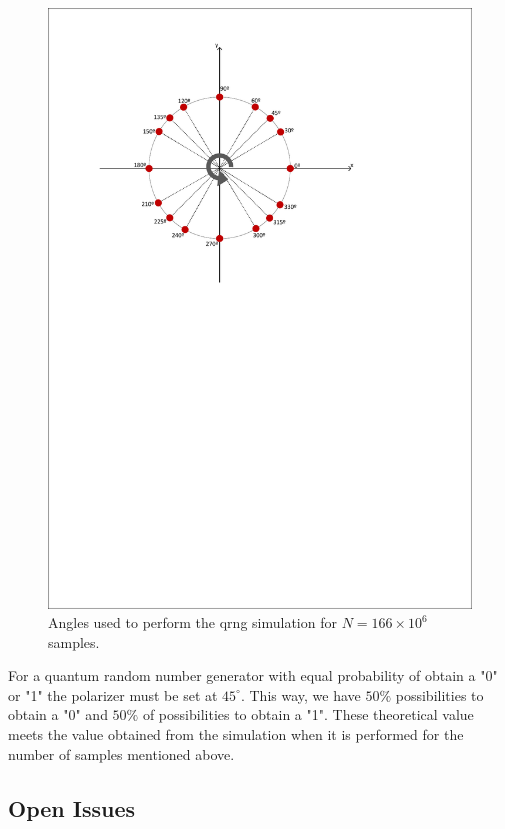 \begin{figure}[h]
    \centering
        \includegraphics[clip, trim=0.5cm 15.5cm 2.5cm 1cm, width=1.00\textwidth]{./sdf/quantum_random_number_generator/figures_raw/sphere.pdf}
    \caption{Angles used to perform the qrng simulation for $N=166 \times 10^{6}$ samples. }\label{sphere}
\end{figure}

For a quantum random number generator with equal probability of obtain a "0" or "1" the polarizer must be set at $45^{\circ}$. This way, we have $50\%$ possibilities to obtain a "0" and $50\%$ of possibilities to obtain a "1". These theoretical value meets the value obtained from the simulation when it is performed for the number of samples mentioned above.

\subsection{Open Issues}


\newpage




\cleardoublepage
